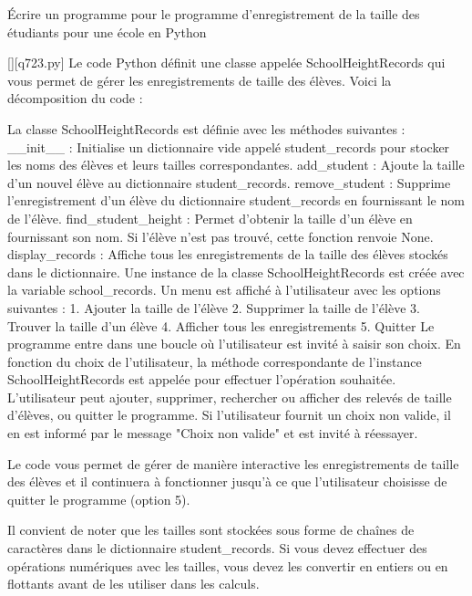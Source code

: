         \question
        Écrire un programme pour le programme d'enregistrement de la taille des étudiants pour une école en Python
        \par
        \begin{solution}
            \renewcommand{\nomfichier}{q723.py}
            \pythonfile{\chemincode \nomfichier}[][\nomfichier]
            Le code Python définit une classe appelée SchoolHeightRecords qui vous permet de gérer les enregistrements de taille des élèves. Voici la décomposition du code :

    La classe SchoolHeightRecords est définie avec les méthodes suivantes :
        __init__ : Initialise un dictionnaire vide appelé student_records pour stocker les noms des élèves et leurs tailles correspondantes.
        add_student : Ajoute la taille d'un nouvel élève au dictionnaire student_records.
        remove_student : Supprime l'enregistrement d'un élève du dictionnaire student_records en fournissant le nom de l'élève.
        find_student_height : Permet d'obtenir la taille d'un élève en fournissant son nom. Si l'élève n'est pas trouvé, cette fonction renvoie None.
        display_records : Affiche tous les enregistrements de la taille des élèves stockés dans le dictionnaire.
    Une instance de la classe SchoolHeightRecords est créée avec la variable school_records.
    Un menu est affiché à l'utilisateur avec les options suivantes :
        1. Ajouter la taille de l'élève
        2. Supprimer la taille de l'élève
        3. Trouver la taille d'un élève
        4. Afficher tous les enregistrements
        5. Quitter
    Le programme entre dans une boucle où l'utilisateur est invité à saisir son choix.
    En fonction du choix de l'utilisateur, la méthode correspondante de l'instance SchoolHeightRecords est appelée pour effectuer l'opération souhaitée. L'utilisateur peut ajouter, supprimer, rechercher ou afficher des relevés de taille d'élèves, ou quitter le programme.
    Si l'utilisateur fournit un choix non valide, il en est informé par le message "Choix non valide" et est invité à réessayer.

Le code vous permet de gérer de manière interactive les enregistrements de taille des élèves et il continuera à fonctionner jusqu'à ce que l'utilisateur choisisse de quitter le programme (option 5).

Il convient de noter que les tailles sont stockées sous forme de chaînes de caractères dans le dictionnaire student_records. Si vous devez effectuer des opérations numériques avec les tailles, vous devez les convertir en entiers ou en flottants avant de les utiliser dans les calculs.
        \end{solution}
        

